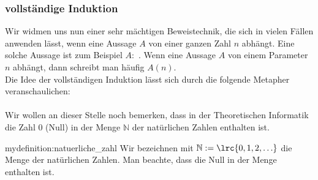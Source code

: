 \subsubsection{vollständige Induktion}
Wir widmen uns nun einer sehr mächtigen Beweistechnik, die sich in vielen Fällen anwenden lässt, wenn eine Aussage $A$ von einer ganzen Zahl $n$ abhängt. Eine solche Aussage ist zum Beispiel $A:$ . Wenn eine Aussage $A$ von einem Parameter $n$ abhängt, dann schreibt man häufig $A(n)$.\\

\noindent
Die Idee der vollständigen Induktion lässt sich durch die folgende Metapher veranschaulichen:\\

\noindent
{}\\

\noindent
Wir wollen an dieser Stelle noch bemerken, dass in der Theoretischen Informatik die Zahl $0$ (Null) in der Menge $\mathbb{N}$ der natürlichen Zahlen enthalten ist.

\begin{mydefinition}{mydefinition:natuerliche_zahl}
Wir bezeichnen mit $\mathbb{N} := \lrc{0,1,2,\ldots }$ die Menge der natürlichen Zahlen. Man beachte, dass die Null in der Menge enthalten ist.
\end{mydefinition}

